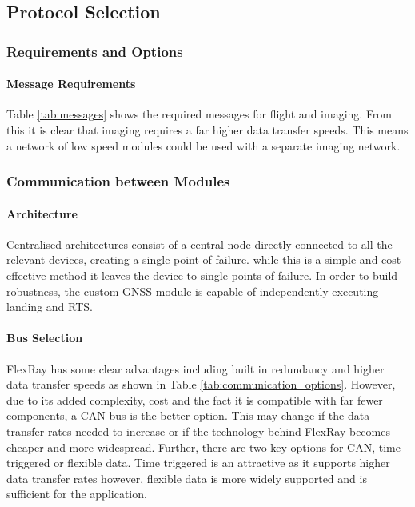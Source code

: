 \subsection{Protocol Selection}\label{sub_section:tgt_protocol_selection}

\subsubsection{Requirements and Options}\label{sub_sub_section:tgt_requirements}
\paragraph{Message Requirements}
Table \ref{tab:messages} shows the required messages for flight and imaging. From this it is clear that imaging requires a far higher data transfer speeds. This means a network of low speed modules could be used with a separate imaging network.



\subsubsection{Communication between Modules}\label{sub_sub_section:tgt_comms_modules}
\paragraph{Architecture}
Centralised architectures consist of a central node directly connected to all the relevant devices, creating a single point of failure. while this is a simple and cost effective method it leaves the device to single points of failure. In order to build robustness, the custom \gls{GNSS} module is capable of independently executing landing and \gls{RTS}.  
\paragraph{Bus Selection}
FlexRay has some clear advantages including built in redundancy and higher data transfer speeds as shown in Table \ref{tab:communication_options}. However, due to its added complexity, cost and the fact it is compatible with far fewer components, a \gls{CAN} bus is the better option. This may change if the data transfer rates needed to increase or if the technology behind FlexRay becomes cheaper and more widespread. Further, there are two key options for \gls{CAN}, time triggered or flexible data. Time triggered is an attractive as it supports higher data transfer rates however, flexible data is more widely supported and is sufficient for the application.\cite{CANFlexRay}
 

